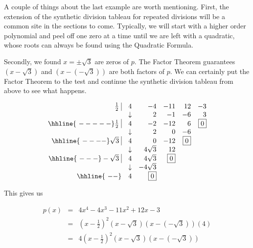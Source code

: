\documentclass{ximera}
\begin{document}
A couple of things about the last example are worth mentioning. First, the extension of the synthetic division tableau for repeated divisions will be a common site in the sections to come. Typically, we will start with a higher order polynomial and peel off one zero at a time until we are left with a quadratic, whose roots can always be found using the Quadratic Formula.  

\medskip

Secondly, we found $x = \pm \sqrt{3}$ are zeros of $p$.  The Factor Theorem guarantees $\left(x-\sqrt{3}\right)$ and $\left(x - \left(-\sqrt{3}\right)\right)$ are both factors of $p$.  We can certainly put the Factor Theorem to the test and continue the synthetic division tableau from above to see what happens.

\[\begin{array}{rrrrrr}
 \frac{1}{2} \, \, \vline& 4 & -4 & -11  & 12 & -3 \\

  & \downarrow &  2  &  -1  & -6 & 3\\ \hhline{~-----} 
  
  \frac{1}{2} \, \, \vline&  4  &   -2  & -12 & 6 &  \fbox{$0$}  \\
    
  & \downarrow &  2  &  0  & -6 &\\ \hhline{~----} 
 
  
 \sqrt{3} \, \, \vline  & 4  &   0  & -12 & \fbox{0} &   \\
  
                        & \downarrow &  4\sqrt{3}  & 12  & &\\ \hhline{~---} 
 
   -\sqrt{3} \, \, \vline  & 4  &  4\sqrt{3}  & \fbox{0} &  &   \\  
       
                          & \downarrow &  -4\sqrt{3}  &   & &\\ \hhline{~--} 
       
													& 4  &  \fbox{0}  &  &  &   \\

\end{array}\]

This gives us

 \[\begin{array}{rcl} 
 
 p(x) & = &  4x^4-4x^3-11x^2+12x-3 \\
        & = & \left(x-\frac{1}{2}\right)^2 \left(x-\sqrt{3}\right)\left(x - \left(-\sqrt{3}\right)\right) (4) \\
        & = &  4\left(x-\frac{1}{2}\right)^2 \left(x-\sqrt{3}\right)\left(x - \left(-\sqrt{3}\right)\right) \\ \end{array} \]
\end{document}
